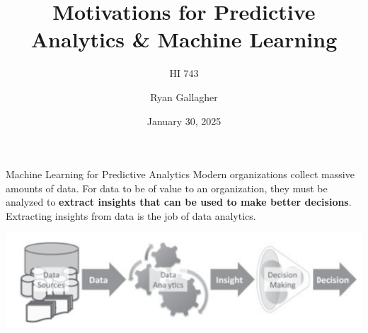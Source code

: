 \documentclass[aspectratio=169,xcolor=dvipsnames]{beamer}
\title{Motivations for Predictive Analytics \& Machine Learning}
\subtitle{HI 743}
\author{Ryan Gallagher}
\institute
{
    Department of Health Informatics and Administration \\
    Zilber College of Public Health \\
    University of Wisconsin - Milwaukee%
}
\date{January 30, 2025} %
\begin{document}
\begin{frame}
    \titlepage
\end{frame}


\section{}
\begin{frame}{Machine Learning for Predictive Analytics}
Modern organizations collect massive amounts of data. For data to be of value to an organization, they must be analyzed to \textbf{extract insights that can be used to make better decisions}. Extracting insights from data is the job of data analytics. 
\vspace{1cm}
\begin{center}
\includegraphics[scale=0.5]{images/fig1.1.png}
\end{center}


\end{frame}

\end{document}
